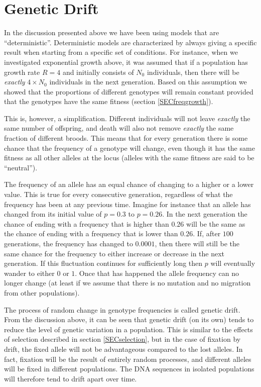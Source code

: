 \documentclass[11pt,a4paper]{book}
\newcommand{\e}{\emph}
\begin{document}
\section{Genetic Drift \label{SECdrift}}

In the discussion presented above we have been using models  that are ``deterministic''. Deterministic models are characterized by always giving a specific result when starting from a specific set of conditions. For instance, when we investigated exponential growth above, it was assumed that if a population has growth rate  $R=4$ and initially consists of $N_0$ individuals, then there will be  \e{exactly} $4\times N_0$ individuals in the next generation. Based on this assumption we showed that the proportions of different genotypes will remain constant  provided that the genotypes have the same fitness (section \ref{SECfreqgrowth}). 

This is, however, a simplification. Different individuals will not leave \e{exactly} the same number of offspring, and death will also not remove \e{exactly} the same fraction of different broods. This means that for every generation there is some chance that the frequency of a genotype will change, even though it has the same fitness as all other alleles at the locus (alleles with the same fitness are said to be ``neutral''). 

The frequency of an allele has an equal chance of changing to a higher or a lower value. This is true for every consecutive generation, regardless of what the frequency has been at any previous time. Imagine for instance that an allele has changed from its initial value of $p=0.3$ to $p=0.26$. In the next generation the chance of ending with a frequency that is higher than  $0.26$ will be the same as the chance of ending with  a frequency that is lower than $0.26$. If, after $100$ generations, the frequency has changed to $0.0001$, then there  will still be the same chance for the frequency to either increase or decrease in the next generation.  If this fluctuation continues for sufficiently long then $p$ will eventually wander to either $0$ or $1$.  Once that has happened the allele frequency can no longer change (at least if we assume that there is no mutation and no migration from other populations). 

The process of random change in genotype frequencies is called genetic drift. From the discussion above, it can be seen that genetic drift (on its own) tends to reduce the level of genetic variation in a population. This is similar to the effects of selection described in section \ref{SECselection}, but in the case of fixation by drift, the fixed allele will not be advantageous compared to the lost alleles. In fact, fixation will  be the result of entirely random processes, and different alleles will be fixed in different populations. The DNA sequences in isolated populations will therefore tend to drift apart over time. 
\end{document}
